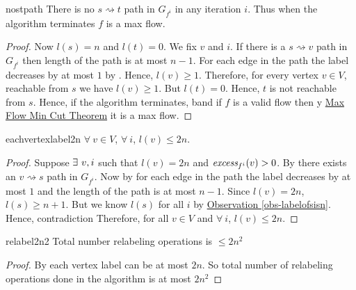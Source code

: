 \begin{corolary}{}{nostpath}
	There is no $s\rightsquigarrow t$ path in $G_{f^i}$ in any iteration $i$. Thus when the algorithm terminates $f$ is a max flow.
\end{corolary}
\begin{proof}
	Now $l(s)=n$ and $l(t)=0$. We fix $v$ and $i$. If there is a $s\rightsquigarrow v$ path in $G_{f^i}$ then length of the path is at most $n-1$. For each edge in the path the label decreases by at most $1$ by . Hence, $l(v)\geq 1$. Therefore, for every vertex $v\in V$, reachable from $s$ we have $l(v)\geq 1$. But $l(t)=0$. Hence, $t$ is not reachable from $s$. 	Hence, if the algorithm terminates, band if $f$ is a valid flow then y \hyperref[th:maxflowmincut]{Max Flow Min Cut Theorem}  it is a max flow.
\end{proof}
\begin{corolary}{}{eachvertexlabel2n}
	$\forall\ v\in V$, $\forall\ i$, $l(v)\leq 2n$.
\end{corolary}
\begin{proof}
	Suppose $\exists\ v,i$ such that $l(v)=2n$ and $\emph{excess}_{f^i}(v)>0$. By  there exists an $v\rightsquigarrow s$ path in $G_{f^i}$. Now by  for each edge in the path the label decreases by at most $1$ and the length of the path is at most $n-1$. Since $l(v)=2n$, $l(s)\geq n+1$. But we know $l(s)$ for all $i$ by \hyperref[obs-labelofsisn]{Observation \ref{obs-labelofsisn}}. Hence, contradiction \ctr Therefore, for all $v\in V$ and $\forall\ i$, $l(v)\leq 2n$.
\end{proof}

\begin{corolary}{}{relabel2n2}
	Total number relabeling operations is $\leq 2n^2$
\end{corolary}
\begin{proof}
	By  each vertex label can be at most $2n$. So total number of relabeling operations done in the algorithm is at most $2n^2$
\end{proof}

